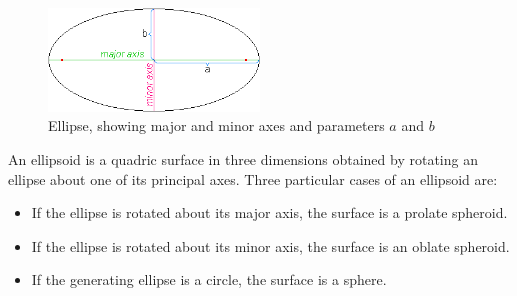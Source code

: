 \begin{figure}[htb]
\begin{center}
\includegraphics[width=0.5\textwidth,height=0.245\textwidth]{../images/form_factor/Ellipsoid/Elpsminr.png}
\end{center}
\caption{Ellipse, showing major and minor axes and parameters $a$ and $b$}
\label{minormajoraxes}
\end{figure}

An ellipsoid is a quadric surface in three dimensions obtained by
rotating an ellipse about one of its principal axes. Three
particular cases of an ellipsoid are:
\begin{itemize}
\item If the ellipse is rotated about its major axis, the surface is a prolate spheroid.
\item If the ellipse is rotated about its minor axis, the surface is an oblate spheroid.
\item If the generating ellipse is a circle, the surface is a sphere.
\end{itemize}

